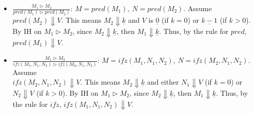 \begin{solution}
\begin{itemize}
        \item $\frac{M_1 \rhd M_2}{pred(M_1) \rhd pred(M_2)}$: $M = pred(M_1),\ N = pred(M_2)$. 
              Assume $pred(M_2) \Downarrow V$. This means $M_2 \Downarrow \underline{k}$ and $V$ is $\underline{0}$ (if $k = 0$) 
                or $\underline{k-1}$ (if $k > 0$). By IH on $M_1 \rhd M_2$, since $M_2 \Downarrow \underline{k}$, 
                    then $M_1 \Downarrow \underline{k}$. Thus, by the rule for $pred$, $pred(M_1) \Downarrow V$.
    
        \item $\frac{M_1 \rhd M_2}{ifz(M_1, N_1, N_2) \rhd ifz(M_2, N_1, N_2)}$: $M = ifz(M_1, N_1, N_2),\ N = ifz(M_2, N_1, N_2)$. 
              Assume \\
              $ifz(M_2, N_1, N_2) \Downarrow V$. This means $M_2 \Downarrow \underline{k}$ and either $N_1 \Downarrow V$ (if $k = 0$) or $N_2 \Downarrow V$ (if $k > 0$). 
              By IH on $M_1 \rhd M_2$, since $M_2 \Downarrow \underline{k}$, then $M_1 \Downarrow \underline{k}$. 
              Thus, by the rule for $ifz$, $ifz(M_1, N_1, N_2) \Downarrow V$.

    \end{itemize}


\end{solution}
